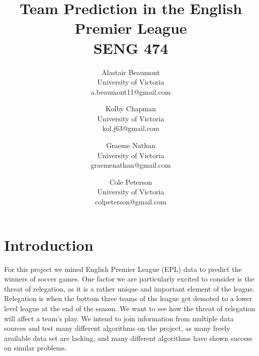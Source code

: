 \documentclass[conference]{IEEEtran}
\begin{document}
%
	
\title{Team Prediction in the English Premier League\\ {\large SENG 474}}

\author{%
  Alastair Beaumont\\University of Victoria\\a.beaumont11@gmail.com
  \and Kolby Chapman\\University of Victoria\\kol.j63@gmail.com
  \and Graeme Nathan\\University of Victoria\\graemenathan@gmail.com
  \and Cole Peterson\\University of Victoria\\colpeterson@gmail.com
}

\maketitle

\IEEEpeerreviewmaketitle

\section{Introduction}
For this project we mined English Premier League (EPL) data to predict the winners of soccer games. One factor we are particularly excited to consider is the threat of relegation, as it is a rather unique and important element of the league. Relegation is when the bottom three teams of the league get demoted to a lower level league at the end of the season. We want to see how the threat of relegation will affect a team's play. We intend to join information from multiple data sources and test many different algorithms on the project, as many freely available data set are lacking, and many different algorithms have shown success on similar problems.
\end{document}
